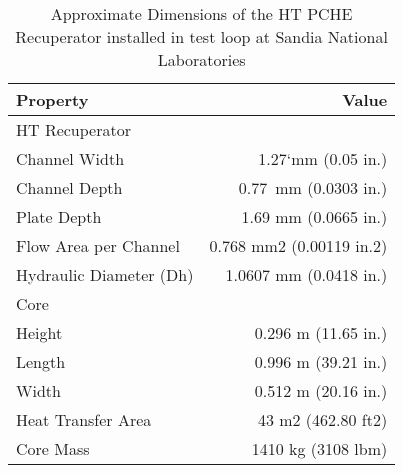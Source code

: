 \begin{table}
\label{tab:Approximate}
\caption{Approximate Dimensions of the HT PCHE Recuperator installed in test loop at Sandia National Laboratories \cite{Pasch2012}}
\begin{center}
\begin{tabulary}{0.9\textwidth}{LR}
\toprule
Property 	&	Value	\\
\midrule
HT Recuperator	&		\\
Channel Width 	&	1.27`mm (0.05 in.)	\\
Channel Depth 	&	0.77~mm (0.0303 in.)	\\
Plate Depth	&	 1.69 mm (0.0665 in.)	\\
Flow Area per Channel 	&	0.768 mm2 (0.00119 in.2)	\\
Hydraulic Diameter (Dh) 	&	1.0607 mm (0.0418 in.)	\\
Core	&		\\
Height 	&	0.296 m (11.65 in.)	\\
Length 	&	0.996 m (39.21 in.)	\\
Width 	&	0.512 m (20.16 in.)	\\
Heat Transfer Area 	&	43 m2 (462.80 ft2)	\\
Core Mass	&	 1410 kg (3108 lbm)	\\

\bottomrule
\end{tabulary}
\end{center}
\end{table}